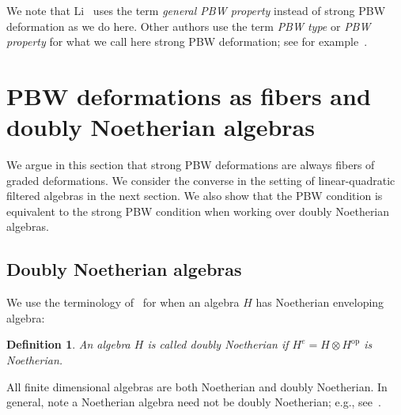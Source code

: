 \documentclass[11pt]{amsart}
\numberwithin{equation}{section}
\newtheorem{definition}[equation]{Definition}
\DeclareMathOperator{\op}{op}
\renewcommand{\_}[1]{\mbox{$_{\left( #1 \right)}$}}
\newcommand{\ot}{\otimes}
\begin{document}
\vspace{1ex}

We note that Li~\cite{Li} uses the term  {\em general PBW property}
instead of strong PBW deformation as we do here.   
Other authors use the term {\em PBW type}  or {\em PBW property} for what we call
here strong PBW deformation; 
see for example~\cite{Braverman-Gaitsgory,Flake19,FlakeSahi,Khare}.


\section{PBW deformations as fibers and doubly Noetherian algebras}
\label{sec:DoublyNoetherian}
We argue in this section that strong PBW deformations
are always fibers of graded deformations.  We consider the converse
in the setting of linear-quadratic filtered algebras in the next section.
We also show that the PBW condition is equivalent to the strong PBW
condition
when working over 
doubly Noetherian algebras.

\subsection*{Doubly Noetherian algebras}
We use the terminology of~\cite{YZ} for when an algebra $H$ has
Noetherian enveloping algebra:
\begin{definition}
{\em  An algebra $H$ 
is called {\em doubly Noetherian} if
$H^e=H\ot H^{\op}$ is Noetherian.
}
\end{definition}
All finite dimensional algebras are both Noetherian
and doubly Noetherian.
In general, note a Noetherian algebra need not be doubly Noetherian; 
e.g., see~\cite[Theorem 8.2]{Rogalski}.
%
\end{document}
